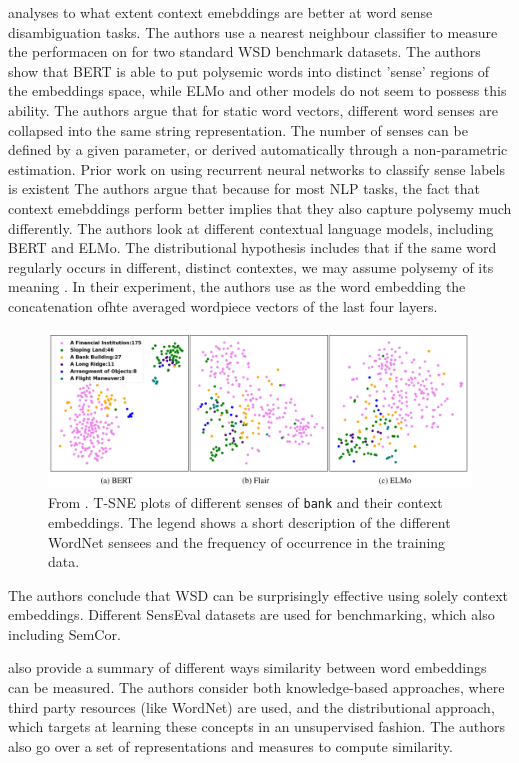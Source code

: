 \documentclass[a4paper,12pt,twoside,openright]{report}
\begin{document}

\cite{wiedmann19} analyses to what extent context emebddings are better at word sense disambiguation tasks.
The authors use a nearest neighbour classifier to measure the performacen on  for two standard WSD benchmark datasets.
The authors show that BERT is able to put polysemic words into distinct 'sense' regions of the embeddings space, while ELMo and other models do not seem to possess this ability.
The authors argue that for static word vectors, different word senses are collapsed into the same string representation.
The number of senses can be defined by a given parameter, or derived automatically through a non-parametric estimation.
Prior work on using recurrent neural networks to classify sense labels is existent
The authors argue that because for most NLP tasks, the fact that context emebddings perform better implies that they also capture polysemy much differently.
The authors look at different contextual language models, including BERT and ELMo.
The distributional hypothesis includes that if the same word regularly occurs in different, distinct contextes, we may assume polysemy of its meaning \cite{miller91}.
In their experiment, the authors use as the word embedding the concatenation ofhte averaged wordpiece vectors of the last four layers. \\

\begin{figure}[h]
	\center
  \includegraphics[width=0.6\linewidth]{./assets/relatedwork/wsd_bert.png}
  \caption{From \cite{wiedmann19}. T-SNE plots of different senses of \texttt{bank} and their context embeddings. The legend shows a short description of the different WordNet sensees and the frequency of occurrence in the training data.
  }
  \label{fig:bert_wsd}
\end{figure}

The authors conclude that WSD can be surprisingly effective using solely context embeddings.
Different SensEval datasets are used for benchmarking, which also including SemCor.

\cite{navigli19} also provide a summary of different ways similarity between word embeddings can be measured.
The authors consider both knowledge-based approaches, where third party resources (like WordNet) are used, and the distributional approach, which targets at learning these concepts in an unsupervised fashion.
The authors also go over a set of representations and measures to compute similarity.
\end{document}
